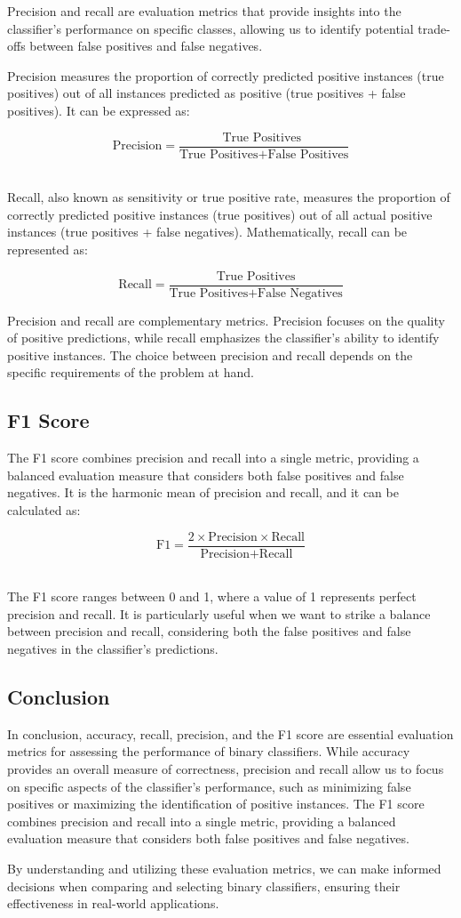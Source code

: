 Precision and recall are evaluation metrics that provide insights into the classifier's performance on specific classes, allowing us to identify potential trade-offs between false positives and false negatives.

Precision measures the proportion of correctly predicted positive instances (true positives) out of all instances predicted as positive (true positives + false positives). It can be expressed as:

$$\text{Precision} = \frac{ \text{True Positives }}
{\text{True Positives} + \text{False Positives}}$$
​	

Recall, also known as sensitivity or true positive rate, measures the proportion of correctly predicted positive instances (true positives) out of all actual positive instances (true positives + false negatives). Mathematically, recall can be represented as:

$$ \text{Recall} = \frac{\text{True Positives}} {\text{True Positives} + \text{False Negatives}}$$


Precision and recall are complementary metrics. Precision focuses on the quality of positive predictions, while recall emphasizes the classifier's ability to identify positive instances. The choice between precision and recall depends on the specific requirements of the problem at hand.

\subsection{F1 Score}

The F1 score combines precision and recall into a single metric, providing a balanced evaluation measure that considers both false positives and false negatives. It is the harmonic mean of precision and recall, and it can be calculated as:

$$\text{F1} = \frac{ 2 \times \text{Precision} \times \text{Recall}}
{\text{Precision} + \text{Recall} }$$
​	
 
The F1 score ranges between 0 and 1, where a value of 1 represents perfect precision and recall. It is particularly useful when we want to strike a balance between precision and recall, considering both the false positives and false negatives in the classifier's predictions.

\subsection{Conclusion}

In conclusion, accuracy, recall, precision, and the F1 score are essential evaluation metrics for assessing the performance of binary classifiers. While accuracy provides an overall measure of correctness, precision and recall allow us to focus on specific aspects of the classifier's performance, such as minimizing false positives or maximizing the identification of positive instances. The F1 score combines precision and recall into a single metric, providing a balanced evaluation measure that considers both false positives and false negatives.

By understanding and utilizing these evaluation metrics, we can make informed decisions when comparing and selecting binary classifiers, ensuring their effectiveness in real-world applications.